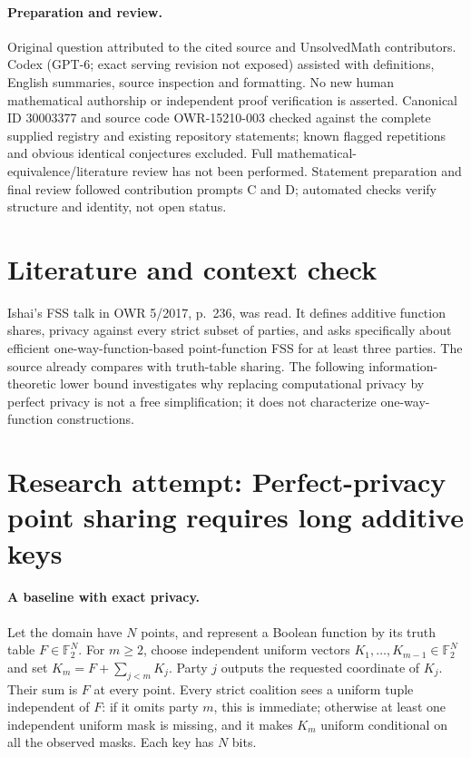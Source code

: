 \documentclass[11pt]{article}
\begin{document}
\paragraph{Preparation and review.}
Original question attributed to the cited source and UnsolvedMath contributors. Codex (GPT-6; exact serving revision not exposed) assisted with definitions, English summaries, source inspection and formatting. No new human mathematical authorship or independent proof verification is asserted. Canonical ID 30003377 and source code OWR-15210-003 checked against the complete supplied registry and existing repository statements; known flagged repetitions and obvious identical conjectures excluded. Full mathematical-equivalence/literature review has not been performed. Statement preparation and final review followed contribution prompts C and D; automated checks verify structure and identity, not open status.
\label{end:30003377}

\section{Literature and context check}
Ishai's FSS talk in OWR 5/2017, p.~236, was read. It defines additive function shares, privacy against every strict subset of parties, and asks specifically about efficient one-way-function-based point-function FSS for at least three parties. The source already compares with truth-table sharing. The following information-theoretic lower bound investigates why replacing computational privacy by perfect privacy is not a free simplification; it does not characterize one-way-function constructions.
\section{Research attempt: Perfect-privacy point sharing requires long additive keys}

\paragraph{A baseline with exact privacy.}
Let the domain have $N$ points, and represent a Boolean function by its truth table $F\in\mathbb F_2^N$. For $m\ge2$, choose independent uniform vectors $K_1,\ldots,K_{m-1}\in\mathbb F_2^N$ and set $K_m=F+\sum_{j<m}K_j$. Party $j$ outputs the requested coordinate of $K_j$. Their sum is $F$ at every point. Every strict coalition sees a uniform tuple independent of $F$: if it omits party $m$, this is immediate; otherwise at least one independent uniform mask is missing, and it makes $K_m$ uniform conditional on all the observed masks. Each key has $N$ bits.
\end{document}
